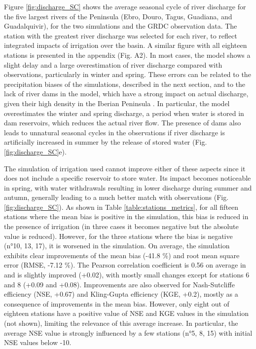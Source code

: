 Figure \ref{fig:discharge_SC} shows the average seasonal cycle of river discharge for the five largest rivers of the Peninsula (Ebro, Douro, Tagus, Guadiana, and Guadalquivir), for the two simulations and the GRDC observation data. The station with the greatest river discharge was selected for each river, to reflect integrated impacts of irrigation over the basin. A similar figure with all eighteen stations is presented in the appendix (Fig. A2).
In most cases, the model shows a slight delay and a large overestimation of river discharge compared with observations, particularly in winter and spring. These errors can be related to the precipitation biases of the simulations, described in the next section, and to the lack of river dams in the model, which have a strong impact on actual discharge, given their high density in the Iberian Peninsula \citep[Fig. \ref{fig:selected_stations}, ][]{sabater_chapter_2022, moran-tejeda_reservoir_2012, lobera_geomorphic_2015}. In particular, the model overestimates the winter and spring discharge, a period when water is stored in dam reservoirs, which reduces the actual river flow.
The presence of dams also leads to unnatural seasonal cycles in the observations if river discharge is artificially increased in summer by the release of stored water (Fig. \ref{fig:discharge_SC}e).

The simulation of irrigation used cannot improve either of these aspects since it does not include a specific reservoir to store water. Its impact becomes noticeable in spring, with water withdrawals resulting in lower discharge during summer and autumn, generally leading to a much better match with observations (Fig. \ref{fig:discharge_SC}). 
As shown in Table \ref{table:stations_metrics}, for all fifteen stations where the mean bias is positive in the \noirr simulation, this bias is reduced in the presence of irrigation (in three cases it becomes negative but the absolute value is reduced). However, for the three stations where the \noirr bias is negative (n°10, 13, 17), it is worsened in the \irr simulation. On average, the \irr simulation exhibits clear improvements of the mean bias (-41.8 \%) and root mean square error (RMSE, -7.12 \%). The Pearson correlation coefficient is 0.56 on average in \noirr and is slightly improved (+0.02), with mostly small changes except for stations 6 and 8 (+0.09 and +0.08). Improvements are also observed for Nash-Sutcliffe efficiency (NSE, +0.67) and Kling-Gupta efficiency (KGE, +0.2), mostly as a consequence of improvements in the mean bias. However, only eight out of eighteen stations have a positive value of NSE and KGE values in the \noirr simulation (not shown), limiting the relevance of this average increase. In particular, the average NSE value is strongly influenced by a few stations (n°5, 8, 15) with initial NSE values below -10.

